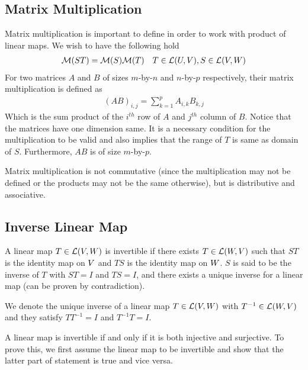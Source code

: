 \documentclass[../../linear_algebra.tex]{subfiles}
\begin{document}
\subsection{Matrix Multiplication}
Matrix multiplication is important to define in order to work with product of linear maps. We wish to have the following hold
\begin{align*}
    \mathcal{M}(ST) = \mathcal{M}(S) \mathcal{M}(T) \quad T \in \mathcal{L}(U, V), S \in \mathcal{L}(V, W)
\end{align*}
For two matrices $A$ and $B$ of sizes $m$-by-$n$ and $n$-by-$p$ respectively, their matrix multiplication is defined as
\begin{align*}
    (AB)_{i,j} = \sum_{k=1}^{p} A_{i,k}B_{k,j}
\end{align*}
Which is the sum product of the $i^{th}$ row of $A$ and $j^{th}$ column of $B$. Notice that the matrices have one dimension same. It is a necessary condition for the multiplication to be valid and also implies that the range of $T$ is same as domain of $S$. Furthermore, $AB$ is of size $m$-by-$p$.\newline

Matrix multiplication is not commutative (since the multiplication may not be defined or the products may not be the same otherwise), but is distributive and associative.


\subsection{Inverse Linear Map}
A linear map $T \in \mathcal{L}(V, W)$ is invertible if there exists $T \in \mathcal{L}(W, V)$ such that $ST$ is the identity map on $V$ and $TS$ is the identity map on $W$. $S$ is said to be the inverse of $T$ with $ST = I$ and $TS = I$, and there exists a unique inverse for a linear map (can be proven by contradiction).\newline

We denote the unique inverse of a linear map $T \in \mathcal{L}(V, W)$ with $T^{-1} \in \mathcal{L}(W, V)$ and they satisfy $TT^{-1} = I$ and $T^{-1}T = I$.\newline

A linear map is invertible if and only if it is both injective and surjective. To prove this, we first assume the linear map to be invertible and show that the latter part of statement is true and vice versa.\newline
\end{document}
